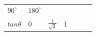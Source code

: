 {\begin{tabular}[t]{|l|l|l|l|l|l|l|}
                  \begin{math}{90}^{\circ }\end{math}
                 &
    
    
        
                  \begin{math}{180}^{\circ }\end{math}
     \tabularnewline\cline{1-1}\cline{2-2}\cline{3-3}\cline{4-4}\cline{5-5}\cline{6-6}\cline{7-7}
    
    
        
                  \begin{math}tan\theta \end{math}
                 &
    
    
        0 &
    
    
        
                  \begin{math}\frac{1}{\sqrt{3}}\end{math}
                 &
    
    
        1 &
    
    
        

\end{tabular}}
